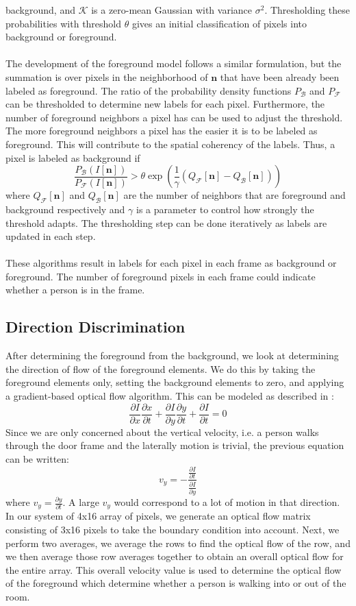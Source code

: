 \documentclass[12pt,oneside]{article} %
\begin{document}
background, and $\mathcal{K}$ is a zero-mean Gaussian with variance $\sigma^2$. Thresholding these probabilities
with threshold $\theta$ gives an initial classification of pixels into background or foreground.
\\ \\
The development of the foreground model follows a similar formulation, but the summation is over
pixels in the neighborhood of $\mathbf{n}$ that have been already been labeled as foreground. The
ratio of the probability density functions $P_\mathcal{B}$ and 
$P_\mathcal{F}$ can be thresholded to determine new labels for each pixel. Furthermore,
the number of foreground neighbors a pixel has can be used to adjust the threshold. The more foreground
neighbors a pixel has the easier it is to be labeled as foreground. This will contribute to the spatial
coherency of the labels. Thus, a pixel is labeled as background if
$$\frac{P_\mathcal{B}(I[\mathbf{n}])}{P_\mathcal{F}(I[\mathbf{n}])} > \theta \exp \left(\frac{1}{\gamma} 
	(Q_\mathcal{F}[\mathbf{n}] - Q_\mathcal{B}[\mathbf{n}] )\right)$$
where $Q_\mathcal{F}[\mathbf{n}]$ and $Q_\mathcal{B}[\mathbf{n}]$ are the number of neighbors that are 
foreground and background respectively and $\gamma$ is a parameter to control how strongly the threshold
adapts. The thresholding step can be done iteratively as labels are updated in each step.
\\ \\
These algorithms result in labels for each pixel in each frame as background or foreground. The number of foreground
pixels in each frame could indicate whether a person is in the frame.

\subsection{Direction Discrimination}
After determining the foreground from the background, we look at determining the direction of flow of the foreground elements. We do this by taking the foreground elements only, setting the background elements to zero, and applying a gradient-based optical flow algorithm. This can be modeled as described in \cite{Smith97}:
$$\frac{\partial I}{\partial x}\frac{\partial x}{\partial t}+\frac{\partial I}{\partial y}\frac{\partial y}{\partial t} + \frac{\partial I}{\partial t}=0$$
Since we are only concerned about the vertical velocity, i.e. a person walks through the door frame and the laterally motion is trivial, the previous equation can be written: 
$$v_y = - \frac{\frac{\partial I}{\partial t}}{\frac{\partial I}{\partial y}}$$
where $v_y =  \frac{\partial y}{\partial t}$. A large $v_y $ would correspond to a lot of motion in that direction. In our system of 4x16 array of pixels, we generate an optical flow matrix consisting of 3x16 pixels to take the boundary condition into account. Next, we perform two averages, we average the rows to find the optical flow of the row, and we then average those row averages together to obtain an overall optical flow for the entire array. This overall velocity value is used to determine the optical flow of the foreground which determine whether a person is walking into or out of the room. 
\end{document}
